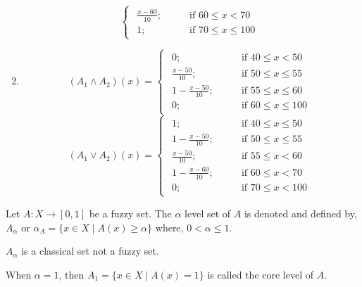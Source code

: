 \documentclass[../main-sheet.tex]{subfiles}
\begin{document}
\begin{ex}
\begin{enumerate}
\[\begin{cases}
\begin{aligned}
                    \frac{x-60}{10}; \qquad&\text{if }60\leq x<70\\
                    1; \qquad&\text{if }70\leq x\leq 100
                \end{aligned}
            \end{cases}
            \]
        \item 
        \[
            (A_1\wedge A_2)(x)=\begin{cases}
                \begin{aligned}
                    0; \qquad&\text{if }40\leq x<50\\
                    \frac{x-50}{10}; \qquad&\text{if }50\leq x\leq 55\\
                    1-\frac{x-50}{10}; \qquad&\text{if }55\leq x\leq 60\\
                    0; \qquad&\text{if }60\leq x\leq 100
                \end{aligned}
            \end{cases}
            \]
        \[
            (A_1\vee A_2)(x)=\begin{cases}
                \begin{aligned}
                    1; \qquad&\text{if }40\leq x\leq 50\\
                    1-\frac{x-50}{10}; \qquad&\text{if }50\leq x\leq 55\\
                    \frac{x-50}{10}; \qquad&\text{if }55\leq x< 60\\
                    1-\frac{x-60}{10}; \qquad&\text{if }60\leq x< 70\\
                    0; \qquad&\text{if }70\leq x< 100
                \end{aligned}
            \end{cases}
            \]
\end{enumerate}
\end{ex}
\begin{defn}
    Let \(A :X\to [0,1]\) be a fuzzy set. The \(\alpha\) level set of \(A \) is denoted and defined by, \(A_\alpha\) or \(\alpha_A=\{x\in X\mid A(x)\geq \alpha\}\) where, \(0<\alpha\leq 1\).
\end{defn}
\begin{rem}
    \(A_\alpha\) is a classical set not a fuzzy set.
\end{rem}
\newpage
\begin{defn}
    When \(\alpha=1\), then \(A_1=\{x\in X\mid A(x)=1\}\) is called the core level of \(A \).
\end{defn}
\end{document}
